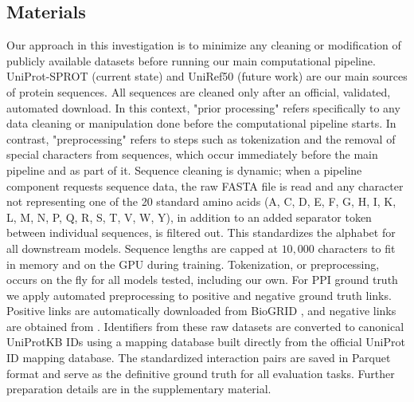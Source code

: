 \documentclass[utf8]{article}
\begin{document}
	\subsection{Materials}
	Our approach in this investigation is to minimize any cleaning or modification of publicly available datasets before running our main computational pipeline. UniProt-SPROT (current state) and UniRef50 (future work) are our main sources of protein sequences. All sequences are cleaned only after an official, validated, automated download. In this context, "prior processing" refers specifically to any data cleaning or manipulation done before the computational pipeline starts. In contrast, "preprocessing" refers to steps such as tokenization and the removal of special characters from sequences, which occur immediately before the main pipeline and as part of it. Sequence cleaning is dynamic; when a pipeline component requests sequence data, the raw FASTA file is read and any character not representing one of the 20 standard amino acids (A, C, D, E, F, G, H, I, K, L, M, N, P, Q, R, S, T, V, W, Y), in addition to an added separator token between individual sequences, is filtered out. This standardizes the alphabet for all downstream models. Sequence lengths are capped at $10,000$ characters to fit in memory and on the GPU during training. Tokenization, or preprocessing, occurs on the fly for all models tested, including our own. For PPI ground truth we apply automated preprocessing to positive and negative ground truth links. Positive links are automatically downloaded from BioGRID \cite{oughtred_biogriddatabasecomprehensive_2021}, and negative links are obtained from \cite{trabuco_negativeproteinprotein_2012}. Identifiers from these raw datasets are converted to canonical UniProtKB IDs using a mapping database built directly from the official UniProt ID mapping database. The standardized interaction pairs are saved in Parquet format and serve as the definitive ground truth for all evaluation tasks. Further preparation details are in the supplementary material.
	
\end{document}

